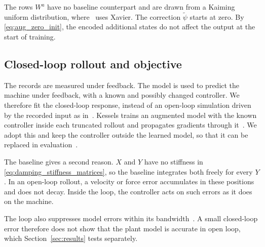 The rows $W^a$ have no baseline counterpart and are drawn from a Kaiming
uniform distribution, where~\cite[Sec.~5.4.2]{hoekstra2026lfr} uses Xavier.
The correction $\tilde\psi$ starts at zero.
By \eqref{eq:aug_zero_init}, the encoded additional states do not affect the
output at the start of training.

\subsection{Closed-loop rollout and objective}\label{sec:aug_closed_loop}
The records are measured under feedback.
The model is used to predict the machine under feedback, with a known and
possibly changed controller.
We therefore fit the closed-loop response, instead of an open-loop
simulation driven by the recorded input as
in~\cite[Eq.~(22)]{hoekstra2026lfr}.
Kessels trains an augmented model with the known controller inside each
truncated rollout and propagates gradients through
it~\cite[Eqs.~(5.12), (5.13c), (5.13d)]{kessels2025ai}.
We adopt this and keep the controller outside the learned model, so that it
can be replaced in evaluation~\cite[Sec.~5.3.2.3]{kessels2025ai}.

The baseline gives a second reason.
$X$ and $Y$ have no stiffness in \eqref{eq:damping_stiffness_matrices}, so the
baseline integrates both freely for every $Y$.
In an open-loop rollout, a velocity or force error accumulates in these
positions and does not decay.
Inside the loop, the controller acts on such errors as it does on the
machine.

The loop also suppresses model errors within its
bandwidth~\cite[Sec.~5.3.2.3]{kessels2025ai}.
A small closed-loop error therefore does not show that the plant model is
accurate in open loop, which Section~\ref{sec:results} tests separately.

